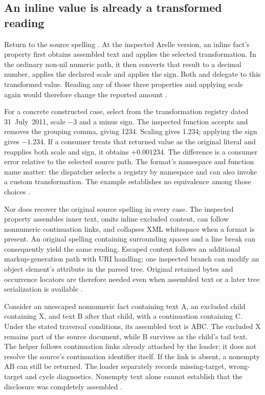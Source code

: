 \subsection{An inline value is already a transformed reading}

Return to the source spelling . At the inspected Arelle version,
an inline fact's  property first obtains assembled text and applies
the selected transformation. In the ordinary non-nil numeric path, it then
converts that result to a decimal number, applies the declared scale and
applies the sign. Both  and  delegate to this
transformed value. Reading any of those three properties and applying scale
again would therefore change the reported amount
\citep{arelleinlinevalues2026}.

For a concrete constructed case, select  from the
transformation registry dated 31~July~2011, scale $-3$ and a minus sign. The
inspected function accepts  and removes the grouping comma, giving
1234. Scaling gives 1.234; applying the sign gives $-1.234$. If a consumer
treats that returned value as the original literal and reapplies both scale
and sign, it obtains $+0.001234$. The difference is a consumer error relative
to the selected source path. The format's namespace and function name matter:
the dispatcher selects a registry by namespace and can also invoke a custom
transformation. The example establishes no equivalence among those choices
\citep{arelleinlinevalues2026}.

Nor does  recover the original source spelling in every case.
The inspected property assembles inner text, omits inline excluded content,
can follow nonnumeric continuation links, and collapses XML whitespace when a
format is present. An original spelling containing surrounding spaces and a
line break can consequently yield the same  reading. Escaped
content follows an additional markup-generation path with URI handling; one
inspected branch can modify an object element's  attribute in
the parsed tree. Original retained bytes and occurrence locators are therefore
needed even when assembled text or a later tree serialization is available
\citep{arelleinlinevalues2026}.

Consider an unescaped nonnumeric fact containing text A, an excluded child
containing X, and text B after that child, with a continuation containing C.
Under the stated traversal conditions, its assembled text is ABC. The excluded
X remains part of the source document, while B survives as the child's tail
text. The helper follows continuation links already attached by the loader;
it does not resolve the source's continuation identifier itself. If the link
is absent, a nonempty AB can still be returned. The loader separately records
missing-target, wrong-target and cycle diagnostics. Nonempty text alone cannot
establish that the disclosure was completely assembled
\citep{arelleinlinevalues2026}.

